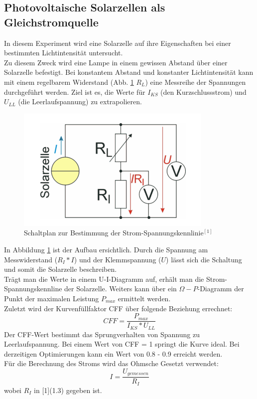 \documentclass[12pt,a4paper]{article}
\begin{document}
\begin{multicols}{2}
\section{Photovoltaische Solarzellen als Gleichstromquelle}
In diesem Experiment wird eine Solarzelle auf ihre Eigenschaften bei einer bestimmten Lichtintensität untersucht. 
\\
Zu diesem Zweck wird eine Lampe in einem gewissen Abstand über einer Solarzelle befestigt. Bei konstantem Abstand und konstanter Lichtintensität kann mit einem regelbarem Widerstand (Abb. \ref{fig:schaltbild_solarzelle} $R_L$) eine Messreihe der Spannungen durchgeführt werden. Ziel ist es, die Werte für $I_{KS}$ (den Kurzschlussstrom) und $U_{LL}$ (die Leerlaufspannung) zu extrapolieren. \\
\begin{figure}[H]
	\centering
	\includegraphics[scale=0.6]{./figure/solarzelle_schaltplan.png}
	\caption{Schaltplan zur Bestimmung der Strom-Spannungskennlinie$^{[1]}$}
	\label{fig:schaltbild_solarzelle}
\end{figure}
\noindent
In Abbildung \ref{fig:schaltbild_solarzelle} ist der Aufbau ersichtlich. Durch die Spannung am Messwiderstand ($R_I*I$) und der Klemmspannung ($U$) lässt sich die Schaltung und somit die Solarzelle beschreiben.\\
Trägt man die Werte in einem U-I-Diagramm auf, erhält man die Strom-Spannungskennline der Solarzelle. Weiters kann über ein $\Omega-P$-Diagramm der Punkt der maximalen Leistung $P_{max}$ ermittelt werden.\\
Zuletzt wird der Kurvenfüllfaktor CFF über folgende Beziehung errechnet:
$$CFF = \frac{P_{max}}{I_{KS}*U_{LL}}$$
Der CFF-Wert bestimmt das Sprungverhalten von Spannung zu Leerlaufspannung. Bei einem Wert von CFF = 1 springt die Kurve ideal. Bei derzeitigen Optimierungen kann ein Wert von 0.8 - 0.9 erreicht werden.\\
Für die Berechnung des Stroms wird das Ohmsche Gesetzt verwendet:
$$I = \frac{U_{gemessen}}{R_I}$$
wobei $R_I$ in [1](1.3) gegeben ist.


\end{multicols}
\end{document}
